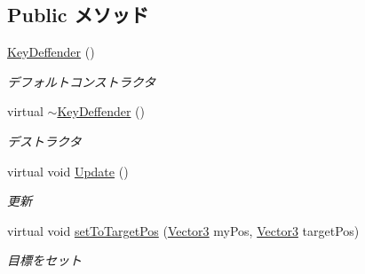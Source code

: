 \subsection*{Public メソッド}
\begin{DoxyCompactItemize}
\item 
\hyperlink{class_key_deffender_a858bc8e1bd986fdbc9d9fa8f31caba91}{Key\-Deffender} ()
\begin{DoxyCompactList}\small\item\em デフォルトコンストラクタ \end{DoxyCompactList}\item 
virtual \hyperlink{class_key_deffender_a00e0afd26850736b536896aae04f51ba}{$\sim$\-Key\-Deffender} ()
\begin{DoxyCompactList}\small\item\em デストラクタ \end{DoxyCompactList}\item 
virtual void \hyperlink{class_key_deffender_a7262f14770e5cdc20b5e717b98b9a1e2}{Update} ()
\begin{DoxyCompactList}\small\item\em 更新 \end{DoxyCompactList}\item 
virtual void \hyperlink{class_key_deffender_a8580a17ef23e802604ebc00e54c7c3a9}{set\-To\-Target\-Pos} (\hyperlink{struct_vector3}{Vector3} my\-Pos, \hyperlink{struct_vector3}{Vector3} target\-Pos)
\begin{DoxyCompactList}\small\item\em 目標をセット \end{DoxyCompactList}\end{DoxyCompactItemize}
